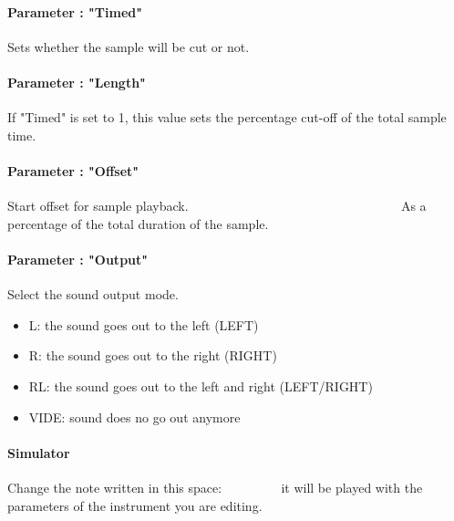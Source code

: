\paragraph{Parameter : "Timed"} Sets whether the sample will be cut or not.

\paragraph{Parameter : "Length"} If "Timed" is set to 1, this value sets the percentage cut-off of the total sample time.

\paragraph{Parameter : "Offset"} Start offset for sample playback.
                                 As a percentage of the total duration of the sample.

\paragraph{Parameter : "Output"} Select the sound output mode.
\medskip

\begin{itemize}
    \item{L: the sound goes out to the left (LEFT)}
    \item{R: the sound goes out to the right (RIGHT)}
    \item{RL: the sound goes out to the left and right (LEFT/RIGHT)}
    \item{VIDE: sound does no go out anymore}
\end{itemize}

\paragraph{Simulator} Change the note written in this space:
         it will be played with the parameters of the instrument you are editing.
